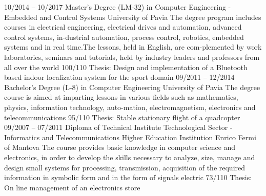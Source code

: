 \documentclass[9pt]{developercv} %
\begin{document}
\begin{entrylist}
	\entry
		{10/2014 -- 10/2017}
		{Master's Degree (LM-32) in Computer Engineering - Embedded and Control Systems}
		{University of Pavia}
		{The degree program includes courses in electrical engineering, electrical drives and automation, advanced control systems, in-dustrial automation, process control, robotics, embedded systems and in real time.The lessons, held in English, are com-plemented by work laboratories, seminars and tutorials, held by industry leaders and professors from all over the world}
		{100/110}
		{Thesis: Design and implementation of a Bluetooth based indoor localization system for the sport domain}
	\entry
		{09/2011 -- 12/2014}
		{Bachelor’s Degree (L-8) in Computer Engineering}
		{University of Pavia}
		{The degree course is aimed at imparting lessons in various fields such as mathematics, physics, information technology, auto-mation, electromagnetism, electronics and telecommunications}
		{95/110}
		{Thesis: Stable stationary flight of a quadcopter}
	\entry
		{09/2007 -- 07/2011}
		{Diploma of Technical Institute Technological Sector - Informatics and Telecommunications}
		{Higher Education Institution Enrico Fermi of Mantova}
		{The course provides basic knowledge in computer science and electronics, in order to develop the skills necessary to analyze, size, manage and design small systems for processing, transmission, acquisition of the required information in symbolic form and in the form of signals electric}
		{73/110}
		{Thesis: On line management of an electronics store}
\end{entrylist}


\end{document}

